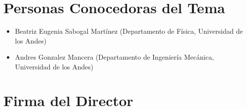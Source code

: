 \documentclass[12pt]{article}
\begin{document}
\section{Personas Conocedoras del Tema}


\begin{itemize}

	\item Beatriz Eugenia Sabogal Martínez (Departamento de Física, Universidad de los Andes) 
	
	\item Andres Gonzalez Mancera (Departamento de Ingeniería Mecánica, Universidad de los Andes)

\end{itemize}







\section*{Firma del Director}
\vspace{1.5cm}
\end{document}

